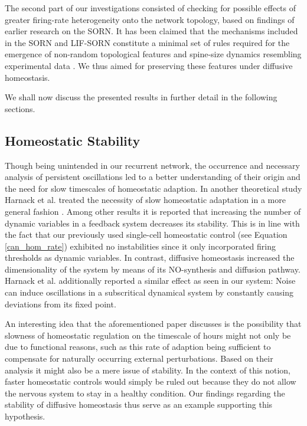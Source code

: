 \documentclass[10pt,a4paper]{article}
\begin{document}
The second part of our investigations consisted of checking for possible effects of greater firing-rate heterogeneity onto the network topology, based on findings of earlier research on the SORN. It has been claimed that the mechanisms included in the SORN and LIF-SORN constitute a minimal set of rules required for the emergence of non-random topological features and spine-size dynamics resembling experimental data \cite{SORN_Paper,Pengsheng_2013}. We thus aimed for preserving these features under diffusive homeostasis.

We shall now discuss the presented results in further detail in the following sections.

\subsection{Homeostatic Stability}
Though being unintended in our recurrent network, the occurrence and necessary analysis of persistent oscillations led to a better understanding of their origin and the need for slow timescales of homeostatic adaption. In another theoretical study Harnack et al. treated the necessity of slow homeostatic adaptation in a more general fashion \cite{Stability_Homeostasis_Harnack_2015}. Among other results it is reported that increasing the number of dynamic variables in a feedback system decreases its stability. This is in line with the fact that our previously used single-cell homeostatic control (see Equation \eqref{can_hom_rate}) exhibited no instabilities since it only incorporated firing thresholds as dynamic variables. In contrast, diffusive homeostasis increased the dimensionality of the system by means of its NO-synthesis and diffusion pathway. Harnack et al. additionally reported a similar effect as seen in our system: Noise can induce oscillations in a subscritical dynamical system by constantly causing deviations from its fixed point.

An interesting idea that the aforementioned paper discusses is the possibility that slowness of homeostatic regulation on the timescale of hours might not only be due to functional reasons, such as this rate of adaption being sufficient to compensate for naturally occurring external perturbations. Based on their analysis it might also be a mere issue of stability. In the context of this notion, faster homeostatic controls would simply be ruled out because they do not allow the nervous system to stay in a healthy condition. Our findings regarding the stability of diffusive homeostasis thus serve as an example supporting this hypothesis.
\end{document}
